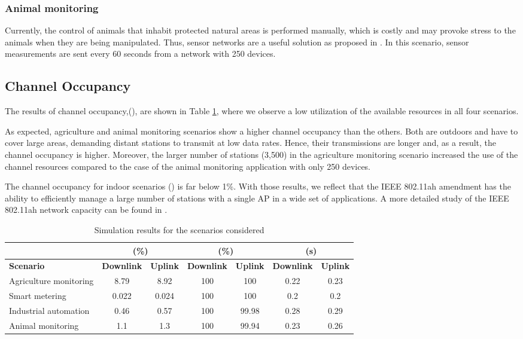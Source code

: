 \documentclass[]{article}
\begin{document}
\subsubsection{Animal monitoring}

Currently, the control of animals that inhabit protected natural areas is performed manually, which is costly and may provoke stress to the animals when they are being manipulated. Thus, sensor networks are a useful solution as proposed in \cite{scenario4}. In this scenario, sensor measurements are sent every 60 seconds from a network with 250 devices.

\subsection{Channel Occupancy}


The results of channel occupancy,(), are shown in Table \ref{table:occupancy}, where we observe a low utilization of the available resources in all four scenarios. 

As expected, agriculture and animal monitoring scenarios show a higher channel occupancy than the others. Both are outdoors and have to cover large areas, demanding distant stations to transmit at low data rates. Hence, their transmissions are longer and, as a result, the channel occupancy is higher. Moreover, the larger number of stations (3,500) in the agriculture monitoring scenario increased the use of the channel resources compared to the case of the animal monitoring application with only 250 devices.

The channel occupancy for indoor scenarios () is far below 1\%. With those results, we reflect that the IEEE 802.11ah amendment has the ability to efficiently manage a large number of stations with a single AP in a wide set of applications. A more detailed study of the IEEE 802.11ah network capacity can be found in \cite{adame2013}.

\renewcommand\thetable{3}
\setcounter{table}{2} 
\begin{table}[h!]
\begin{center}
\begin{tabular}{|l|c|c|c|c|c|c|}
\hline
 & \multicolumn{2}{|c|}{\textbf{} (\%)} & \multicolumn{2}{|c|}{\textbf{} (\%)} & \multicolumn{2}{|c|}{\textbf{} (s)}\\
\hline 
\textbf{Scenario} & \textbf{Downlink} & \textbf{Uplink} & \textbf{Downlink} & \textbf{Uplink} & \textbf{Downlink} & \textbf{Uplink}\\
\hline
Agriculture monitoring & 8.79 & 8.92 & 100 & 100 & 0.22 & 0.23 \\
\hline
Smart metering & 0.022 & 0.024 & 100 & 100 & 0.2 & 0.2\\
\hline
Industrial automation & 0.46 & 0.57 & 100 & 99.98 & 0.28 & 0.29\\
\hline
Animal monitoring & 1.1 & 1.3 & 100 & 99.94 & 0.23 & 0.26\\
\hline
\end{tabular}
\vspace{-0.3cm}
\end{center}
\caption{Simulation results for the scenarios considered}
\label{table:occupancy}
\end{table}
\end{document}
